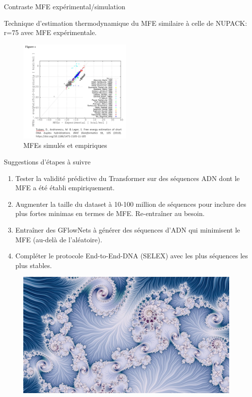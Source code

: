 \documentclass{beamer}
\begin{document}
\begin{frame}{Contraste MFE expérimental/simulation}

Technique d'estimation thermodynamique du MFE similaire à celle de NUPACK: r=75 avec MFE expérimentale.
\begin{figure} \label{fig:MFE_exp_simul}
    \caption{MFEs simulés et empiriques} \center
    \includegraphics[width=0.5\textwidth]{images/MFE_exp_simul.png}
\end{figure}

\end{frame}

\begin{frame}{Suggestions d'étapes à suivre}
\begin{enumerate}
    \item Tester la validité prédictive du Transformer sur des séquences ADN dont le MFE a été établi empiriquement.
    \item Augmenter la taille du dataset à 10-100 million de séquences pour inclure des plus fortes minimas en termes de MFE. Re-entraîner au besoin.
    \item Entraîner des GFlowNets à générer des séquences d'ADN qui minimisent le MFE (au-delà de l'aléatoire).
    \item Compléter le protocole End-to-End-DNA (SELEX) avec les plus séquences les plus stables.
\end{enumerate}

\end{frame}

\begin{frame}

\begin{figure} \label{fig:fractal}
    \center
    \includegraphics[width=1\textwidth]{images/Fractal.jpg}
\end{figure}

\end{frame}
\end{document}
